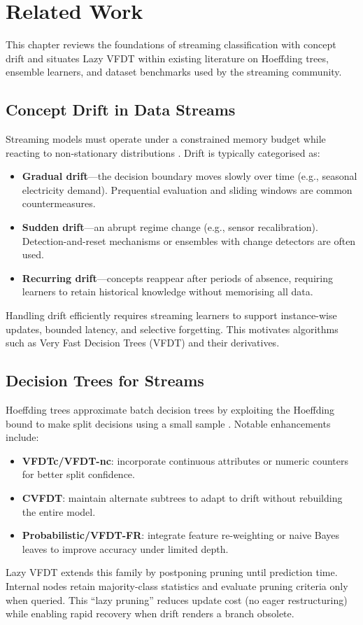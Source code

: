 \cleardoublepage
\chapter{Related Work}
\label{chap:related-work}

This chapter reviews the foundations of streaming classification with concept drift and situates Lazy VFDT within existing literature on Hoeffding trees, ensemble learners, and dataset benchmarks used by the streaming community.

\section{Concept Drift in Data Streams}
Streaming models must operate under a constrained memory budget while reacting to non-stationary distributions \cite{gama2014survey}.  Drift is typically categorised as:
\begin{itemize}
    \item \textbf{Gradual drift}---the decision boundary moves slowly over time (e.g., seasonal electricity demand).  Prequential evaluation and sliding windows are common countermeasures.
    \item \textbf{Sudden drift}---an abrupt regime change (e.g., sensor recalibration).  Detection-and-reset mechanisms or ensembles with change detectors are often used.
    \item \textbf{Recurring drift}---concepts reappear after periods of absence, requiring learners to retain historical knowledge without memorising all data.
\end{itemize}
Handling drift efficiently requires streaming learners to support instance-wise updates, bounded latency, and selective forgetting.  This motivates algorithms such as Very Fast Decision Trees (VFDT) and their derivatives.

\section{Decision Trees for Streams}
Hoeffding trees approximate batch decision trees by exploiting the Hoeffding bound to make split decisions using a small sample \cite{domingos2000vfdt}.  Notable enhancements include:
\begin{itemize}
    \item \textbf{VFDTc/VFDT-nc}: incorporate continuous attributes or numeric counters for better split confidence.
    \item \textbf{CVFDT}: maintain alternate subtrees to adapt to drift without rebuilding the entire model.
    \item \textbf{Probabilistic/VFDT-FR}: integrate feature re-weighting or naive Bayes leaves to improve accuracy under limited depth.
\end{itemize}
Lazy VFDT extends this family by postponing pruning until prediction time.  Internal nodes retain majority-class statistics and evaluate pruning criteria only when queried.  This ``lazy pruning'' reduces update cost (no eager restructuring) while enabling rapid recovery when drift renders a branch obsolete.

